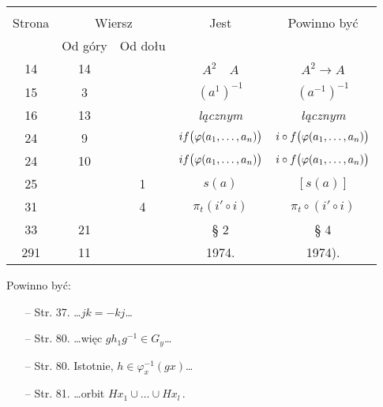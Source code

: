 \documentclass[a4paper,11pt]{article}
\begin{document}
\begin{center}
  \begin{tabular}{|c|c|c|c|c|}
    \hline
    & \multicolumn{2}{c|}{} & & \\
    Strona & \multicolumn{2}{c|}{Wiersz} & Jest
                              & Powinno być \\ \cline{2-3}
    & Od góry & Od dołu & & \\
    \hline
    14 & 14 & & $A^{ 2 } \quad A$ & $A^{ 2 } \to A$ \\
    15 & 3 & & $( a^{ 1 } )^{ -1 }$ & $( a^{ -1 } )^{ -1 }$ \\
    16 & 13 & & \emph{lącznym} & \emph{łącznym} \\
    24 & 9 & & $if\big( \varphi( a_{ 1 }, \ldots, a_{ n } ) \big)$
           & $i \circ f\big( \varphi( a_{ 1 }, \ldots, a_{ n } ) \big)$ \\
    24 & 10 & & $if\big( \varphi( a_{ 1 }, \ldots, a_{ n } ) \big)$
           & $i \circ f\big( \varphi( a_{ 1 }, \ldots, a_{ n } ) \big)$ \\
    25 & & 1 & $s( a )$ & $[ s( a ) ]$ \\
    31 & & 4 & $\pi_{ t }( i' \circ i )$ & $\pi_{ t } \circ ( i' \circ i )$ \\
    33 & 21 & & \S{} 2 & \S{} 4 \\
    291 & 11 & & 1974. & 1974). \\
    \hline
  \end{tabular}
\end{center}

Powinno być:
\begin{itemize}
\item[--] Str. 37. \ldots$j k = -k j$\ldots
\item[--] Str. 80. \ldots więc $g h_{ 1 } g^{ -1 } \in G_{ y }$\ldots
\item[--] Str. 80. Istotnie, $h \in \varphi_{ x }^{ -1 }( g x )$\ldots
\item[--] Str. 81. \ldots orbit
  $H x_{ 1 } \cup \ldots \cup H x_{ l } \, .$
\end{itemize}
\end{document}

